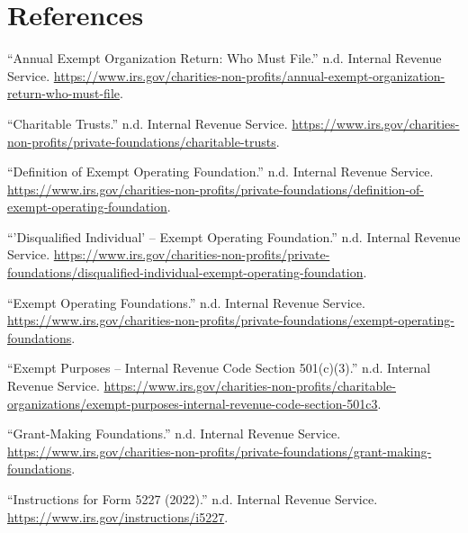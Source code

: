 \documentclass[
  letterpaper,
  DIV=11,
  numbers=noendperiod]{scrreprt}
\newlength{\cslhangindent}
\newlength{\cslentryspacingunit} %
\newenvironment{CSLReferences}[2] %
 {%
  \setlength{\parindent}{0pt}
  \ifodd #1
  \let\oldpar\par
  \def\par{\hangindent=\cslhangindent\oldpar}
  \fi
  \setlength{\parskip}{#2\cslentryspacingunit}
 }%
 {}
\begin{document}

\hypertarget{references}{%
\chapter*{References}\label{references}}


\hypertarget{refs}{}
\begin{CSLReferences}{1}{0}
\leavevmode{}%
{``Annual Exempt Organization Return: Who Must File.''} n.d. Internal
Revenue Service.
\url{https://www.irs.gov/charities-non-profits/annual-exempt-organization-return-who-must-file}.

\leavevmode{}%
{``Charitable Trusts.''} n.d. Internal Revenue Service.
\url{https://www.irs.gov/charities-non-profits/private-foundations/charitable-trusts}.

\leavevmode{}%
{``Definition of Exempt Operating Foundation.''} n.d. Internal Revenue
Service.
\url{https://www.irs.gov/charities-non-profits/private-foundations/definition-of-exempt-operating-foundation}.

\leavevmode{}%
{``'Disqualified Individual' -- Exempt Operating Foundation.''} n.d.
Internal Revenue Service.
\url{https://www.irs.gov/charities-non-profits/private-foundations/disqualified-individual-exempt-operating-foundation}.

\leavevmode{}%
{``Exempt Operating Foundations.''} n.d. Internal Revenue Service.
\url{https://www.irs.gov/charities-non-profits/private-foundations/exempt-operating-foundations}.

\leavevmode{}%
{``Exempt Purposes -- Internal Revenue Code Section 501(c)(3).''} n.d.
Internal Revenue Service.
\url{https://www.irs.gov/charities-non-profits/charitable-organizations/exempt-purposes-internal-revenue-code-section-501c3}.

\leavevmode{}%
{``Grant-Making Foundations.''} n.d. Internal Revenue Service.
\url{https://www.irs.gov/charities-non-profits/private-foundations/grant-making-foundations}.

\leavevmode{}%
{``Instructions for Form 5227 (2022).''} n.d. Internal Revenue Service.
\url{https://www.irs.gov/instructions/i5227}.


\end{CSLReferences}
\end{document}
